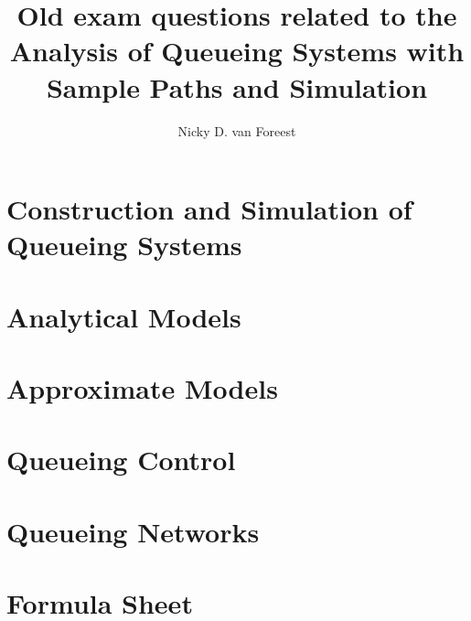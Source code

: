 \documentclass[11pt]{book}
\title{Old exam questions related to the Analysis of Queueing Systems with  Sample Paths and Simulation}
\author{Nicky D. van  Foreest}
\begin{document}
\frontmatter
\maketitle

\mainmatter

\chapter{Construction and Simulation of Queueing Systems}




\chapter{Analytical Models}


\chapter{Approximate Models}


\chapter{Queueing Control}


\chapter{Queueing Networks}



\backmatter


\chapter{Formula Sheet}

\end{document}
